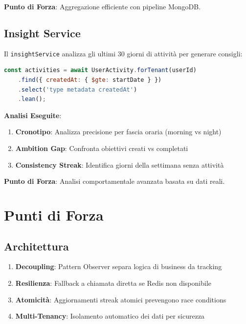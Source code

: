 \documentclass[11pt,a4paper]{article}
\begin{document}
\textbf{Punto di Forza}: Aggregazione efficiente con pipeline MongoDB.

\subsection{Insight Service}

Il \texttt{insightService} analizza gli ultimi 30 giorni di attività per generare consigli:

\begin{lstlisting}[language=JavaScript, caption=Query per insights]
const activities = await UserActivity.forTenant(userId)
    .find({ createdAt: { $gte: startDate } })
    .select('type metadata createdAt')
    .lean();
\end{lstlisting}

\textbf{Analisi Eseguite}:

\begin{enumerate}
    \item \textbf{Cronotipo}: Analizza precisione per fascia oraria (morning vs night)
    \item \textbf{Ambition Gap}: Confronta obiettivi creati vs completati
    \item \textbf{Consistency Streak}: Identifica giorni della settimana senza attività
\end{enumerate}

\textbf{Punto di Forza}: Analisi comportamentale avanzata basata su dati reali.

\section{Punti di Forza}

\subsection{Architettura}

\begin{enumerate}
    \item \textbf{Decoupling}: Pattern Observer separa logica di business da tracking
    \item \textbf{Resilienza}: Fallback a chiamata diretta se Redis non disponibile
    \item \textbf{Atomicità}: Aggiornamenti streak atomici prevengono race conditions
    \item \textbf{Multi-Tenancy}: Isolamento automatico dei dati per sicurezza
\end{enumerate}
\end{document}
